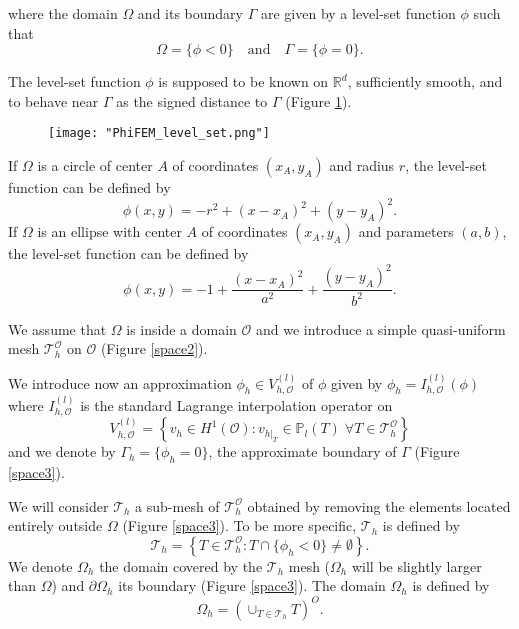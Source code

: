 where the domain $\Omega$ and its boundary $\Gamma$ are given by a level-set function $\phi$ such that
\begin{equation*}
	\Omega=\{\phi < 0\} \quad \text{and} \quad \Gamma=\{\phi = 0\}.
\end{equation*}

The level-set function $\phi$ is supposed to be known on $\mathbb{R}^d$, sufficiently smooth, and to behave near $\Gamma$ as the signed distance to $\Gamma$ (Figure \ref{space1}). 

\begin{figure}[H]
	\centering
	\texttt{[image: "PhiFEM\_level\_set.png"]}
	\label{space1}
\end{figure}

\begin{Example}
	If $\Omega$ is a circle of center $A$ of coordinates $(x_A,y_A)$ and radius $r$, the level-set function can be defined by
	\begin{equation*}
		\phi(x,y)=-r^2+(x-x_A)^2+(y-y_A)^2.
	\end{equation*}
	If $\Omega$ is an ellipse with center $A$ of coordinates $(x_A,y_A)$ and parameters $(a,b)$, the level-set function can be defined by
	\begin{equation*}
		\phi(x,y)=-1+\frac{(x-x_A)^2}{a^2}+\frac{(y-y_A)^2}{b^2}.
	\end{equation*}
\end{Example}

We assume that $\Omega$ is inside a domain $\mathcal{O}$ and we introduce a simple quasi-uniform mesh $\mathcal{T}_h^\mathcal{O}$ on $\mathcal{O}$ (Figure \ref{space2}).
 
We introduce now an approximation $\phi_h\in V_{h,\mathcal{O}}^{(l)}$ of $\phi$ given by $\phi_h=I_{h,\mathcal{O}}^{(l)}(\phi)$ where $I_{h,\mathcal{O}}^{(l)}$ is the standard Lagrange interpolation operator on
\begin{equation*}
	V_{h,\mathcal{O}}^{(l)}=\left\{v_h\in H^1(\mathcal{O}):v_{h|_T}\in\mathbb{P}_l(T) \;  \forall T\in\mathcal{T}_h^\mathcal{O}\right\}
\end{equation*}
and we denote by $\Gamma_h=\{\phi_h=0\}$, the approximate boundary of $\Gamma$ (Figure \ref{space3}).

We will consider $\mathcal{T}_h$ a sub-mesh of $\mathcal{T}_h^\mathcal{O}$ obtained by removing the elements located entirely outside $\Omega$ (Figure \ref{space3}). To be more specific, $\mathcal{T}_h$ is defined by
\begin{equation*}
	\mathcal{T}_h=\left\{T\in \mathcal{T}_h^\mathcal{O}:T\cap\{\phi_h<0\}\ne\emptyset\right\}.
\end{equation*}
We denote $\Omega_h$ the domain covered by the $\mathcal{T}_h$ mesh ($\Omega_h$ will be slightly larger than $\Omega$) and $\partial\Omega_h$ its boundary (Figure \ref{space3}). The domain $\Omega_h$ is defined by
\begin{equation*}
	\Omega_h=\left(\cup_{T\in\mathcal{T}_h}T\right)^O.
\end{equation*}

